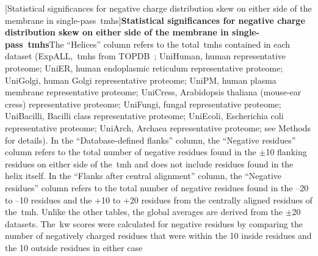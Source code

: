 \begin{table}[htbp!]

    \centering
    [Statistical significances for negative charge distribution skew on either side of the membrane in single-pass~\gls{tmh}s]{\textbf{Statistical significances for negative charge distribution skew on either side of the membrane in single-pass~\gls{tmh}s}The “Helices” column refers to the total~\gls{tmh}s contained in each dataset (ExpALL,~\gls{tmh}s from TOPDB~\cite{Dobson2015}; UniHuman, human representative proteome; UniER, human endoplasmic reticulum representative proteome; UniGolgi, human Golgi representative proteome; UniPM, human plasma membrane representative proteome; UniCress, Arabidopsis thaliana (mouse-ear cress) representative proteome; UniFungi, fungal representative proteome; UniBacilli, Bacilli class representative proteome; UniEcoli, Escherichia coli representative proteome; UniArch, Archaea representative proteome; see Methods for details).
In the ``Database-defined flanks'' column, the ``Negative residues'' column refers to the total number of negative residues found in the $\pm$10 flanking residues on either side of the~\gls{tmh} and does not include residues found in the helix itself.
In the ``Flanks after central alignment'' column, the ``Negative residues'' column refers to the total number of negative residues found in the –20 to –10 residues and the +10 to +20 residues from the centrally aligned residues of the~\gls{tmh}.
Unlike the other tables, the global averages are derived from the $\pm$20 datasets.
The~\gls{kw} scores were calculated for negative residues by comparing the number of negatively charged residues that were within the 10 inside residues and the 10 outside residues in either case}
\end{table}
